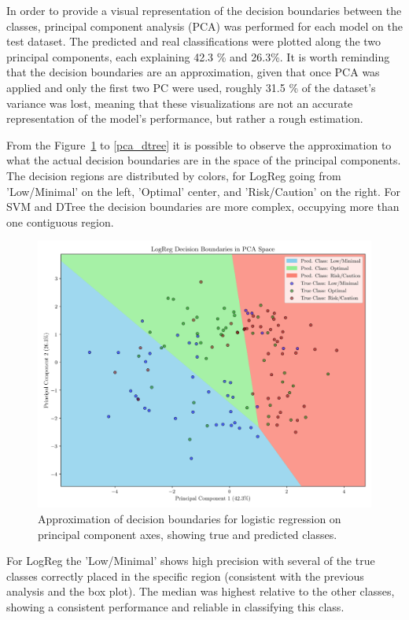 \documentclass[conference]{IEEEtran}
\begin{document}
In order to provide a visual representation of the decision boundaries between the classes, principal component analysis (PCA) was performed for each model on the test dataset. The predicted and real classifications were plotted along the two principal components, each explaining 42.3 \% and 26.3\%. It is worth reminding that the decision boundaries are an approximation, given that once PCA was applied and only the first two PC were used, roughly 31.5 \% of the dataset's variance was lost, meaning that these visualizations are not an accurate representation of the model's performance, but rather a rough estimation.

From the Figure~\ref{pca_reglog} to \ref{pca_dtree} it is possible to observe the approximation to what the actual decision boundaries are in the space of the principal components. The decision regions are distributed by colors, for LogReg going from 'Low/Minimal' on the left, 'Optimal' center, and 'Risk/Caution' on the right. For SVM and DTree the decision boundaries are more complex, occupying more than one contiguous region.

\begin{figure}[H]
    \centering
    \includegraphics[width=1\linewidth]{assets/pca_reglog.png}
    \caption{Approximation of decision boundaries for logistic regression on principal component axes, showing true and predicted classes.}
    \label{pca_reglog}
\end{figure} %

For LogReg the 'Low/Minimal' shows high precision with several of the true classes correctly placed in the specific region (consistent with the previous analysis and the box plot). The median was highest relative to the other classes, showing a consistent performance and reliable in classifying this class.
\end{document}
